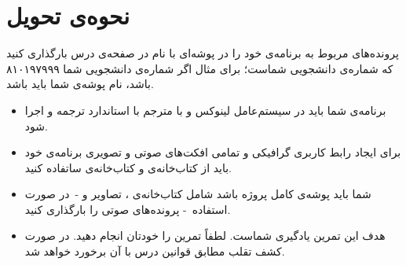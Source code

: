 \documentclass{utap}
\begin{document}
\section{نحوه‌ی تحویل}
    پرونده‌‌های مربوط به برنامه‌ی خود را در پوشه‌ای با نام  در صفحه‌ی  درس بارگذاری کنید که  شماره‌ی دانشجویی شماست؛ برای مثال اگر شماره‌ی دانشجویی شما ۸۱۰۱۹۷۹۹۹ باشد، نام پوشه‌ی شما باید  باشد.
    \begin{itemize}
        \item
برنامه‌ی شما باید در سیستم‌عامل لینوکس و با مترجم  با استاندارد  ترجمه و اجرا شود.
		\item
برای ایجاد رابط کاربری گرافیکی و تمامی افکت‌های صوتی و تصویری برنامه‌ی خود باید از کتاب‌خانه‌ی  و کتاب‌خانه‌ی  ساتفاده کنید.
        \item
شما باید پوشه‌ی کامل پروژه باشد شامل کتاب‌خانه‌ی ، تصاویر و - در صورت استفاده - پرونده‌های صوتی را بارگذاری کنید.
        \item
هدف این تمرین یادگیری شماست. لطفاً تمرین را خودتان انجام دهید. در صورت کشف تقلب مطابق قوانین درس با آن برخورد خواهد شد.
    \end{itemize}
\end{document}
